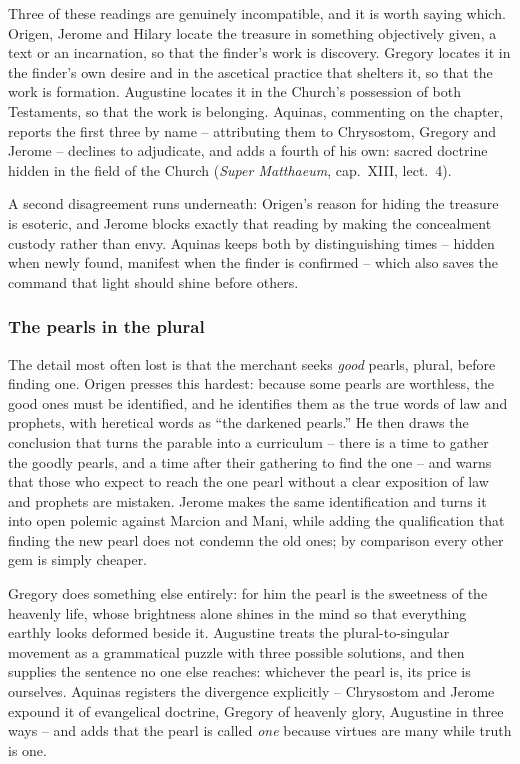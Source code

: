 Three of these readings are genuinely incompatible, and it is worth saying which. Origen, Jerome and Hilary locate the treasure in something objectively given, a text or an incarnation, so that the finder's work is discovery. Gregory locates it in the finder's own desire and in the ascetical practice that shelters it, so that the work is formation. Augustine locates it in the Church's possession of both Testaments, so that the work is belonging. Aquinas, commenting on the chapter, reports the first three by name -- attributing them to Chrysostom, Gregory and Jerome -- declines to adjudicate, and adds a fourth of his own: sacred doctrine hidden in the field of the Church (\emph{Super Matthaeum}, cap.~XIII, lect.~4).

A second disagreement runs underneath: Origen's reason for hiding the treasure is esoteric, and Jerome blocks exactly that reading by making the concealment custody rather than envy. Aquinas keeps both by distinguishing times -- hidden when newly found, manifest when the finder is confirmed -- which also saves the command that light should shine before others.

\subsubsection*{The pearls in the plural}

The detail most often lost is that the merchant seeks \emph{good} pearls, plural, before finding one. Origen presses this hardest: because some pearls are worthless, the good ones must be identified, and he identifies them as the true words of law and prophets, with heretical words as ``the darkened pearls.'' He then draws the conclusion that turns the parable into a curriculum -- there is a time to gather the goodly pearls, and a time after their gathering to find the one -- and warns that those who expect to reach the one pearl without a clear exposition of law and prophets are mistaken. Jerome makes the same identification and turns it into open polemic against Marcion and Mani, while adding the qualification that finding the new pearl does not condemn the old ones; by comparison every other gem is simply cheaper.

Gregory does something else entirely: for him the pearl is the sweetness of the heavenly life, whose brightness alone shines in the mind so that everything earthly looks deformed beside it. Augustine treats the plural-to-singular movement as a grammatical puzzle with three possible solutions, and then supplies the sentence no one else reaches: whichever the pearl is, its price is ourselves. Aquinas registers the divergence explicitly -- Chrysostom and Jerome expound it of evangelical doctrine, Gregory of heavenly glory, Augustine in three ways -- and adds that the pearl is called \emph{one} because virtues are many while truth is one.


